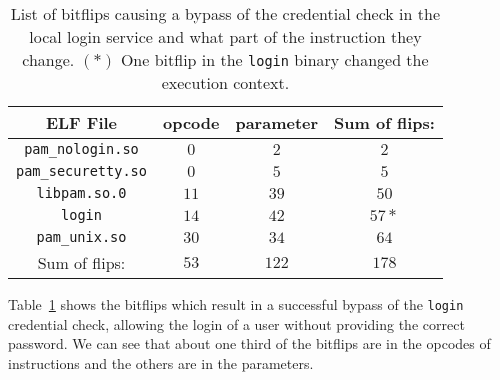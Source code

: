 \begin{table}[!htb]
\centering
\begin{tabular}{c|cc|c}
ELF File & opcode & parameter & Sum of flips:     \\ \hline
\texttt{pam\_nologin.so}   & $0$ & $2$  & $2$     \\
\texttt{pam\_securetty.so} & $0$ & $5$  & $5$     \\
\texttt{libpam.so.0}       & $11$ & $39$ & $50$   \\
\texttt{login}             & $14$ & $42$ & $57*$  \\
\texttt{pam\_unix.so}      & $30$ & $34$ & $64$ \\ \hline
Sum of flips:              & $53$ & $122$ & $178$
\end{tabular}
\caption{List of bitflips causing a bypass of the credential check in the local
login service and what part of the instruction they change. $(*)$ One bitflip
in the \texttt{login} binary changed the execution context.}
\label{tab:loginres}
\end{table}

Table~\ref{tab:loginres} shows the bitflips which result in a successful bypass
of the \texttt{login} credential check, allowing the login of a user without
providing the correct password. We can see that about one third of the bitflips
are in the opcodes of instructions and the others are in the parameters.


